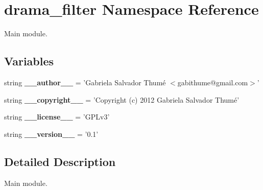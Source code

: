 \hypertarget{namespacedrama__filter}{
\section{drama\_\-filter Namespace Reference}
\label{namespacedrama__filter}
}


Main module.  


\subsection*{Variables}
\begin{DoxyCompactItemize}
\item 
\hypertarget{namespacedrama__filter_addf97eaaae779ccfaf0b2bfec7312326}{
string {\bfseries \_\-\_\-author\_\-\_\-} = 'Gabriela Salvador Thumé $<$gabithume@gmail.com$>$'}
\label{namespacedrama__filter_addf97eaaae779ccfaf0b2bfec7312326}

\item 
\hypertarget{namespacedrama__filter_ac3b3fca28c8a158a8fdbd8e1144ecbbe}{
string {\bfseries \_\-\_\-copyright\_\-\_\-} = 'Copyright (c) 2012 Gabriela Salvador Thumé'}
\label{namespacedrama__filter_ac3b3fca28c8a158a8fdbd8e1144ecbbe}

\item 
\hypertarget{namespacedrama__filter_a24ff149f4c0b2494db341ad717f15eba}{
string {\bfseries \_\-\_\-license\_\-\_\-} = 'GPLv3'}
\label{namespacedrama__filter_a24ff149f4c0b2494db341ad717f15eba}

\item 
\hypertarget{namespacedrama__filter_ad6c73316e4eb631918e8f89475f3a4f3}{
string {\bfseries \_\-\_\-version\_\-\_\-} = '0.1'}
\label{namespacedrama__filter_ad6c73316e4eb631918e8f89475f3a4f3}

\end{DoxyCompactItemize}


\subsection{Detailed Description}
Main module. 